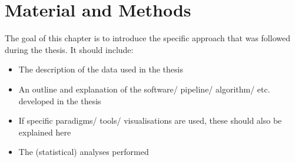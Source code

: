 
\chapter{Material and Methods}
  \label{sec:matmet}

The goal of this chapter is to introduce the specific approach that was followed during the thesis. It should include:
\begin{itemize}
  \item The description of the data used in the thesis
  \item An outline and explanation of the software/ pipeline/ algorithm/ etc. developed in the thesis
  \item If specific paradigms/ tools/ visualisations are used, these should also be explained here
  \item The (statistical) analyses performed
\end{itemize}
  